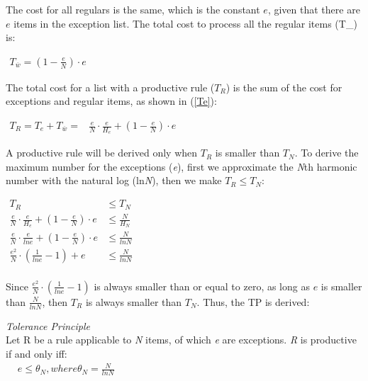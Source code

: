 The cost for all regulars is the same, which is the constant $e$, given that there are $e$ items in the exception list. The total cost to process all the regular items (T_{}) is:
\begin{exe}
\ex \label{Tww}
$\begin{aligned}
T_{\overline{w}} =    (1 - \frac{e}{N})\cdot e
\end{aligned}$
\end{exe}
The total cost for a list with a productive rule ($T_R$) is the sum of the cost for exceptions and regular items, as shown in (\ref{Te}):
\begin{exe}
\ex \label{Te}
$\begin{aligned}
T_R = T_e + T_{\overline{w}} = & \frac{e}{N}\cdot \frac{e}{H_e} + (1-\frac{e}{N})\cdot e&
\end{aligned}$
\end{exe}
A productive rule will be derived only when $T_R$ is smaller than $T_N$. To derive the maximum number for the exceptions (\textit{e}), first we approximate the \textit{N}th harmonic number with the natural log (ln\textit{N}), then we make $T_R \leq T_N$:

\begin{exe}
\ex \label{TRR}
$\begin{aligned}
T_R &\leq T_N &\\
\frac{e}{N}\cdot \frac{e}{H_e} + (1-\frac{e}{N})\cdot e &\leq \frac{N}{H_N} &\\
\frac{e}{N}\cdot \frac{e}{lne} + (1-\frac{e}{N})\cdot e &\leq \frac{N}{lnN}\\
\frac{e^2}{N}\cdot (\frac{1}{lne} -1) + e & \leq \frac{N}{lnN}\\
\end{aligned}$
\end{exe}
Since $\frac{e^2}{N}\cdot(\frac{1}{lne} -1)$ is always smaller than or equal to zero, as long as $e$ is smaller than $\frac{N}{lnN}$,  then $T_R$ is always smaller than $T_N$. Thus, the TP is derived:
\begin{exe}
\ex \textit{Tolerance Principle} \label{TPTPT}\\
Let R be a rule applicable to \textit{N} items, of which \textit{e} are exceptions. \textit{R} is productive if and only iff:\\
$\begin{aligned}
&e \leq \theta_{N}, where \theta_{N} = \frac{N}{lnN}
\end{aligned}$ 
\citep[p.64]{yang2016price}
\end{exe}

